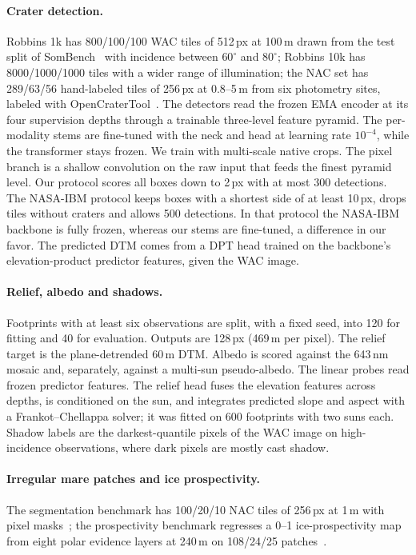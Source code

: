 \paragraph{Crater detection.} Robbins 1k has 800/100/100 WAC tiles of 512\,px at 100\,m drawn from the test split of SomBench~\cite{patil2026sombench} with incidence between $60^\circ$ and $80^\circ$; Robbins 10k has 8000/1000/1000 tiles with a wider range of illumination; the NAC set has 289/63/56 hand-labeled tiles of 256\,px at 0.8--5\,m from six photometry sites, labeled with OpenCraterTool~\cite{heyer2023comparative}. The detectors read the frozen EMA encoder at its four supervision depths through a trainable three-level feature pyramid. The per-modality stems are fine-tuned with the neck and head at learning rate $10^{-4}$, while the transformer stays frozen. We train with multi-scale native crops. The pixel branch is a shallow convolution on the raw input that feeds the finest pyramid level. Our protocol scores all boxes down to 2\,px with at most 300 detections. The NASA-IBM protocol keeps boxes with a shortest side of at least 10\,px, drops tiles without craters and allows 500 detections. In that protocol the NASA-IBM backbone is fully frozen, whereas our stems are fine-tuned, a difference in our favor. The predicted DTM comes from a DPT head trained on the backbone's elevation-product predictor features, given the WAC image.

\paragraph{Relief, albedo and shadows.} Footprints with at least six observations are split, with a fixed seed, into 120 for fitting and 40 for evaluation. Outputs are 128\,px (469\,m per pixel). The relief target is the plane-detrended 60\,m DTM. Albedo is scored against the 643\,nm mosaic and, separately, against a multi-sun pseudo-albedo. The linear probes read frozen predictor features. The relief head fuses the elevation features across depths, is conditioned on the sun, and integrates predicted slope and aspect with a Frankot--Chellappa solver; it was fitted on 600 footprints with two suns each. Shadow labels are the darkest-quantile pixels of the WAC image on high-incidence observations, where dark pixels are mostly cast shadow.

\paragraph{Irregular mare patches and ice prospectivity.} The segmentation benchmark has 100/20/10 NAC tiles of 256\,px at 1\,m with pixel masks~\cite{patil2026sombench,hargitai2025clusters}; the prospectivity benchmark regresses a 0--1 ice-prospectivity map from eight polar evidence layers at 240\,m on 108/24/25 patches~\cite{coyan2025prospectivity}. 

